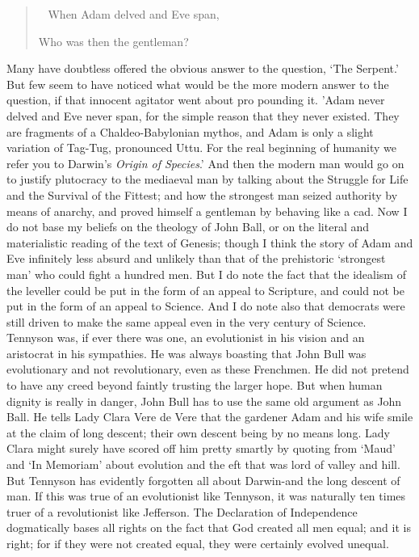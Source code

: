 \documentclass{book}
\newenvironment{mdblockquote}{%
  \begin{quotation}
    \
}{%
  \end{quotation}
}
\begin{document}
\begin{mdblockquote}
	When Adam delved and Eve span,

	Who was then the gentleman?


\end{mdblockquote}
Many have doubtless offered the obvious answer to the question, ‘The Serpent.’ But few seem to have noticed what would be the more modern answer to the question, if that innocent agitator went about pro pounding it. ’Adam never delved and Eve never span, for the simple reason that they never existed. They are fragments of a Chaldeo-Babylonian mythos, and Adam is only a slight variation of Tag-Tug, pronounced Uttu. For the real beginning of humanity we refer you to Darwin’s \emph{Origin of Species}.’ And then the modern man would go on to justify plutocracy to the mediaeval man by talking about the Struggle for Life and the Survival of the Fittest; and how the strongest man seized authority by means of anarchy, and proved himself a gentleman by behaving like a cad. Now I do not base my beliefs on the theology of John Ball, or on the literal and materialistic reading of the text of Genesis; though I think the story of Adam and Eve infinitely less absurd and unlikely than that of the prehistoric ‘strongest man’ who could fight a hundred men. But I do note the fact that the idealism of the leveller could be put in the form of an appeal to Scripture, and could not be put in the form of an appeal to Science. And I do note also that democrats were still driven to make the same appeal even in the very century of Science. Tennyson was, if ever there was one, an evolutionist in his vision and an aristocrat in his sympathies. He was always boasting that John Bull was evolutionary and not revolutionary, even as these Frenchmen. He did not pretend to have any creed beyond faintly trusting the larger hope. But when human dignity is really in danger, John Bull has to use the same old argument as John Ball. He tells Lady Clara Vere de Vere that the gardener Adam and his wife smile at the claim of long descent; their own descent being by no means long. Lady Clara might surely have scored off him pretty smartly by quoting from ‘Maud’ and ‘In Memoriam’ about evolution and the eft that was lord of valley and hill. But Tennyson has evidently forgotten all about Darwin-and the long descent of man. If this was true of an evolutionist like Tennyson, it was naturally ten times truer of a revolutionist like Jefferson. The Declaration of Independence dogmatically bases all rights on the fact that God created all men equal; and it is right; for if they were not created equal, they were certainly evolved unequal.
\end{document}
